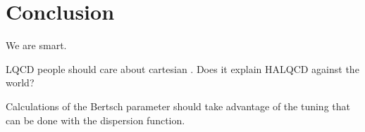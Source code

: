 \section{Conclusion}\label{sec:conclusion}

We are smart.

LQCD people should care about cartesian \Luscher.  Does it explain HALQCD against the world?

Calculations of the Bertsch parameter should take advantage of the tuning that can be done with the dispersion function.

